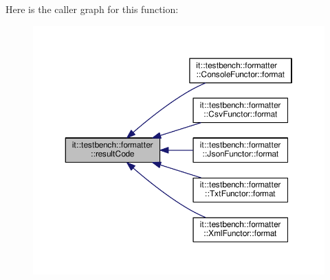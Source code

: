 Here is the caller graph for this function\-:
\nopagebreak
\begin{figure}[H]
\begin{center}
\leavevmode
\includegraphics[width=350pt]{dc/d8b/namespaceit_1_1testbench_1_1formatter_a7af7944336ec0342246cc31437350332_icgraph}
\end{center}
\end{figure}




